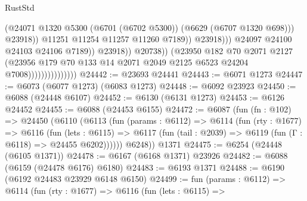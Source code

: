 \begin{lexlean}{RustStd}
\begin{coremodule}
                                                        (@24071
                                                          @1320
                                                          @5300
                                                          (@6701 (@6702 @5300))
                                                          (@6629 (@6707 @1320 @698)))
                                                        @23918))
                                                    @11251
                                                    @11254
                                                    @11257
                                                    @11260
                                                    @7189))
                                                @23918)))
                                          @24097
                                          @24100
                                          @24103
                                          @24106
                                          @7189))
                                      @23918))
                                  @20738))
                              (@23950
                                @182
                                @70
                                @2071
                                @2127
                                (@23956
                                  @179
                                  @70
                                  @133
                                  @14
                                  @2071
                                  @2049
                                  @2125
                                  @6523
                                  @24204
                                  @7008)))))))))))))))
@24442 := @23693 @24441
@24443 := @6071 @1273
@24447 := @6073 (@6077 @1273) (@6083 @1273)
@24448 := @6092 @23923
@24450 := @6088 (@24448 @6107)
@24452 := @6130 (@6131 @1273)
@24453 := @6126 @24452
@24455 := @6088 (@24453 @6155)
@24472 := @6087
    (fun (fn : @102) =>
    @24450
      (@6110
        (@6113
          (fun (params : @6112) =>
          @6114
            (fun (rty : @1677) =>
            @6116
              (fun (lets : @6115) =>
              @6117 (fun (tail : @2039) => @6119 (fun (Γ : @6118) => @24455 @6202))))))
        @6248))
    @1371
@24475 := @6254 (@24448 (@6105 @1371))
@24478 := @6167 (@6168 @1371) @23926
@24482 := @6088 (@6159 (@24478 @6176) @6180)
@24483 := @6193 @1371
@24488 := @6190 (@6192 @24483 @23929 @6148 @6150)
@24499 := fun (params : @6112) =>
  @6114
    (fun (rty : @1677) =>
    @6116
      (fun (lets : @6115) =>

\end{coremodule}
\end{lexlean}
